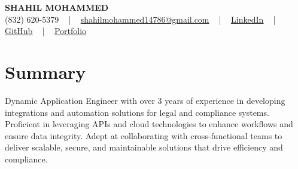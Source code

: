 \documentclass[letterpaper,10pt]{article}
\begin{document}
\begin{center}
    {\fontsize{14pt}{12pt}\selectfont \textbf{\MakeUppercase{Shahil Mohammed}}}\\ \vspace{2pt}
    \fontsize{10pt}{12pt}\selectfont (832) 620-5379 ~ | ~ \href{mailto:shahilmohammed14786@gmail.com}{shahilmohammed14786@gmail.com} ~ | ~  
    \href{https://www.linkedin.com/in/shahil-mohammed-9652931a1/}{\color{blue}\underline{LinkedIn}}  ~ | ~ 
    \href{https://github.com/freakbeast14}{\color{blue}\underline{GitHub}} ~ | ~ 
    \href{https://shahil-mohammed.netlify.app/}{\color{blue}\underline{Portfolio}}
    \vspace{-8pt}
\end{center}

\section{Summary}
\vspace{-2pt}\fontsize{8pt}{9pt}\selectfont
Dynamic Application Engineer with over 3 years of experience in developing integrations and automation solutions for legal and compliance systems. Proficient in leveraging APIs and cloud technologies to enhance workflows and ensure data integrity. Adept at collaborating with cross-functional teams to deliver scalable, secure, and maintainable solutions that drive efficiency and compliance.

\vspace{-5pt}
 
\vspace{-2pt}
\end{document}
